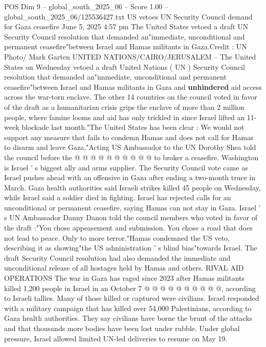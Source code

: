 \begin{textsample}{POS Dim 9 – global\_south\_2025\_06 – Score 1.00 – global\_south\_2025\_06/125536427.txt}  \label{ex:f9_pos_177}
US vetoes UN Security Council demand for Gaza ceasefire June 5, 2025 4:57 pm The United States vetoed a draft UN Security Council resolution that demanded an"immediate, unconditional and permanent ceasefire"between Israel and Hamas militants in Gaza.Credit : UN Photo/ Mark Garten UNITED NATIONS/CAIRO/JERUSALEM -- The United States on Wednesday vetoed a draft United Nations ( UN ) Security Council resolution that demanded an"immediate, unconditional and permanent ceasefire"between Israel and Hamas militants in Gaza and \textbf{unhindered} aid access across the war-torn enclave.
The other 14 countries on the council voted in favor of the draft as a humanitarian crisis grips the enclave of more than 2 million people, where famine looms and aid has only trickled in since Israel lifted an 11-week blockade last month."The United States has been clear : We would not support any measure that fails to condemn Hamas and does not call for Hamas to disarm and leave Gaza,"Acting US Ambassador to the UN Dorothy Shea told the council before the @ @ @ @ @ @ @ @ @ @ to broker a ceasefire.
Washington is Israel ' s biggest ally and arms supplier.
The Security Council vote came as Israel pushes ahead with an offensive in Gaza after ending a two-month truce in March.
Gaza health authorities said Israeli strikes killed 45 people on Wednesday, while Israel said a soldier died in fighting.
Israel has rejected calls for an unconditional or permanent ceasefire, saying Hamas can not stay in Gaza.
Israel ' s UN Ambassador Danny Danon told the council members who voted in favor of the draft :"You chose appeasement and submission.
You chose a road that does not lead to peace.
Only to more terror."Hamas condemned the US veto, describing it as showing"the US administration ' s blind bias"towards Israel.
The draft Security Council resolution had also demanded the immediate and unconditional release of all hostages held by Hamas and others.
RIVAL AID OPERATIONS The war in Gaza has raged since 2023 after Hamas militants killed 1,200 people in Israel in an October 7 @ @ @ @ @ @ @ @ @ @, according to Israeli tallies.
Many of those killed or captured were civilians.
Israel responded with a military campaign that has killed over 54,000 Palestinians, according to Gaza health authorities.
They say civilians have borne the brunt of the attacks and that thousands more bodies have been lost under rubble.
Under global pressure, Israel allowed limited UN-led deliveries to resume on May 19.

\end{textsample}
